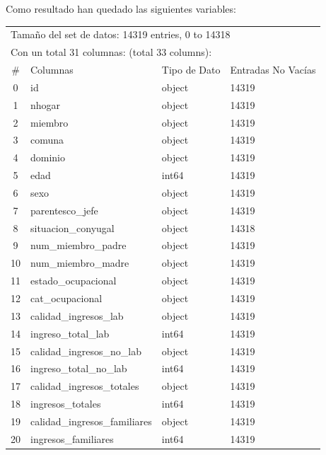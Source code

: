 \documentclass[a4paper]{article}
\begin{document}
    Como resultado han quedado las siguientes variables:
    
    \begin{table}[H]
        \centering
        \begin{tabular}{clll}
            \multicolumn{4}{l}{Tamaño del set de datos: 14319 entries, 0 to 14318} \\
            \multicolumn{4}{l}{Con un total 31 columnas: (total 33 columns):} \\
            \toprule
            \#  & Columnas & Tipo de Dato & Entradas No Vacías \\ \midrule
            0   & id & object & 14319 \\ 
            1   & nhogar & object & 14319 \\ 
            2   & miembro & object & 14319 \\ 
            3   & comuna & object & 14319 \\ 
            4   & dominio & object & 14319 \\ 
            5   & edad & int64 & 14319 \\ 
            6   & sexo & object & 14319 \\ 
            7   & parentesco\_jefe & object & 14319 \\ 
            8   & situacion\_conyugal & object & 14318 \\ 
            9   & num\_miembro\_padre & object & 14319 \\ 
            10  & num\_miembro\_madre & object & 14319 \\ 
            11  & estado\_ocupacional & object & 14319 \\ 
            12  & cat\_ocupacional & object & 14319 \\ 
            13  & calidad\_ingresos\_lab & object & 14319 \\ 
            14  & ingreso\_total\_lab & int64 & 14319 \\ 
            15  & calidad\_ingresos\_no\_lab & object & 14319 \\ 
            16  & ingreso\_total\_no\_lab & int64 & 14319 \\ 
            17  & calidad\_ingresos\_totales & object & 14319 \\ 
            18  & ingresos\_totales & int64 & 14319 \\ 
            19  & calidad\_ingresos\_familiares & object & 14319 \\ 
            20  & ingresos\_familiares & int64 & 14319 \\ 

\end{tabular}
\end{table}
\end{document}
